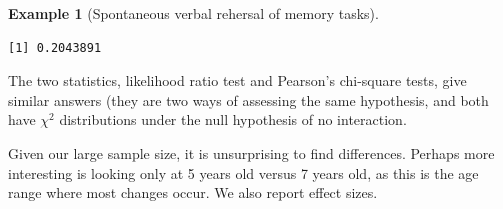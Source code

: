 \documentclass[
  11pt,
  letterpaper,
]{scrbook}
\newenvironment{Shaded}{\begin{snugshade}}{\end{snugshade}}
\newcommand{\AttributeTok}[1]{\textcolor[rgb]{0.40,0.45,0.13}{#1}}
\newcommand{\CommentTok}[1]{\textcolor[rgb]{0.37,0.37,0.37}{#1}}
\newcommand{\ConstantTok}[1]{\textcolor[rgb]{0.56,0.35,0.01}{#1}}
\newcommand{\DecValTok}[1]{\textcolor[rgb]{0.68,0.00,0.00}{#1}}
\newcommand{\FunctionTok}[1]{\textcolor[rgb]{0.28,0.35,0.67}{#1}}
\newcommand{\NormalTok}[1]{\textcolor[rgb]{0.00,0.23,0.31}{#1}}
\newcommand{\OtherTok}[1]{\textcolor[rgb]{0.00,0.23,0.31}{#1}}
\newcommand{\SpecialCharTok}[1]{\textcolor[rgb]{0.37,0.37,0.37}{#1}}
\newcommand{\StringTok}[1]{\textcolor[rgb]{0.13,0.47,0.30}{#1}}
\theoremstyle{definition}
\newtheorem{example}{Example}[chapter]
\theoremstyle{definition}
\theoremstyle{remark}
\begin{document}
\begin{example}[Spontaneous verbal rehersal of memory
tasks]
\begin{verbatim}
[1] 0.2043891
\end{verbatim}

\begin{Shaded}
\end{Shaded}

The two statistics, likelihood ratio test and Pearson's chi-square
tests, give similar answers (they are two ways of assessing the same
hypothesis, and both have \(\chi^2\) distributions under the null
hypothesis of no interaction.

Given our large sample size, it is unsurprising to find differences.
Perhaps more interesting is looking only at 5 years old versus 7 years
old, as this is the age range where most changes occur. We also report
effect sizes.


\end{example}
\end{document}
